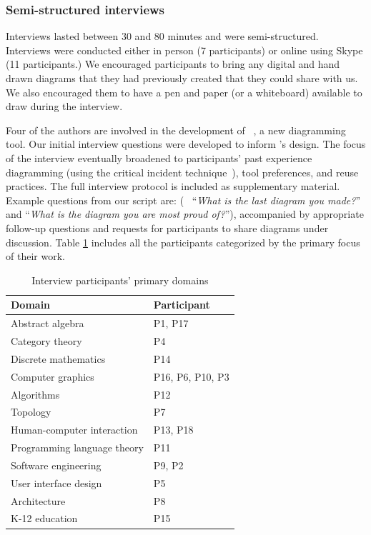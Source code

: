 \subsubsection{Semi-structured interviews}
 
Interviews lasted between 30 and 80 minutes and were semi-structured. Interviews were conducted either in person (7 participants) or online using Skype (11 participants.) We encouraged participants to bring any digital and hand drawn diagrams that they had previously created that they could share with us. We also encouraged them to have a pen and paper (or a whiteboard) available to draw during the interview. 

Four of the authors are involved in the development of \Penrose{}~\cite{DSLDI, OBT}, a new diagramming tool. Our initial interview questions were developed to inform \Penrose{}'s design. The focus of the interview eventually broadened to participants' past experience diagramming (using the critical incident technique~\cite{criticalIncident}), tool preferences, and reuse practices. The full interview protocol is included as supplementary material. Example questions from our script are: (\eg{}~ ``\textit{What is the last diagram you made?}'' and ``\textit{What is the diagram you are most proud of?}''), accompanied by appropriate follow-up questions and requests for participants to share diagrams under discussion. Table \ref{tbl:participants} includes all the participants categorized by the primary focus of their work.

\begin{center}
\begin{table}
\centering
\begin{tabular}{l|l}
Domain & Participant \\ \hline
Abstract algebra & P1, P17 \\ 
Category theory & P4\\ 
Discrete mathematics & P14 \\ 
Computer graphics & P16, P6, P10, P3 \\ 
Algorithms & P12 \\ 
Topology & P7 \\ 
Human-computer interaction & P13, P18 \\ 
Programming language theory & P11 \\ 
Software engineering & P9, P2\\ 
User interface design & P5\\ 
Architecture & P8 \\ 
K-12 education & P15 \\ 
\end{tabular}
\caption{Interview participants' primary domains}
\label{tbl:participants}
\end{table}
\end{center}

